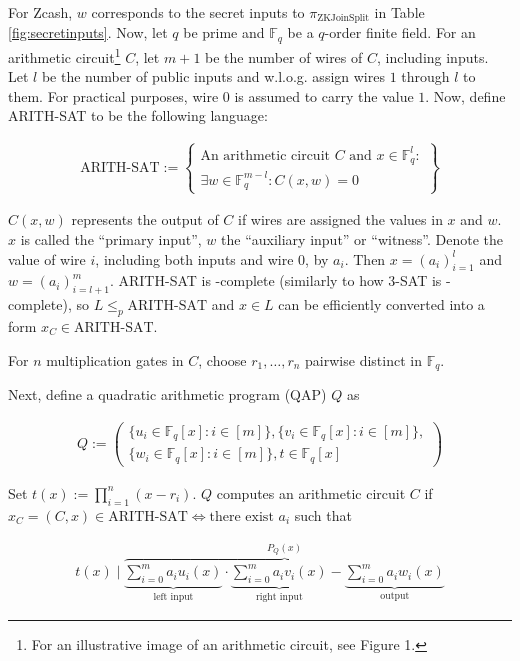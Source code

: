\documentclass{article}
\begin{document}
For Zcash, $w$ corresponds to the secret inputs to $\pi_\text{ZKJoinSplit}$ in Table \ref{fig:secretinputs}.
Now, let $q$ be prime and $\mathbb{F}_q$ be a $q$-order finite field.
For an arithmetic circuit\footnote{For an illustrative image of an arithmetic circuit, see \cite{gennaro:qap} Figure 1.} $C$, let $m + 1$ be the number of wires of $C$, including inputs.
Let $l$ be the number of public inputs and w.l.o.g. assign wires $1$ through $l$ to them.
For practical purposes, wire $0$ is assumed to carry the value $1$.
Now, define ARITH-SAT to be the following language:

\begin{align*}
        \text{ARITH-SAT} := \left\{\begin{aligned}\text{An arithmetic circuit } C \text{ and } x \in \mathbb{F}_q^l \colon \\
        \exists w \in \mathbb{F}_q^{m-l}\colon C(x,w) = 0\end{aligned}\right\}
\end{align*}

$C(x,w)$ represents the output of $C$ if wires are assigned the values in $x$ and $w$.
$x$ is called the ``primary input'', $w$ the ``auxiliary input'' or ``witness''.
Denote the value of wire $i$, including both inputs and wire $0$, by $a_i$.
Then $x = (a_i)_{i=1}^l$ and $w = (a_i)_{i=l+1}^m$.
ARITH-SAT is \NP-complete (similarly to how 3-SAT is \NP-complete), so $L \leq_p \text{ARITH-SAT}$ and $x \in L$ can be efficiently converted into a form $x_C \in \text{ARITH-SAT}$.

For $n$ multiplication gates in $C$, choose $r_1, \ldots, r_n$ pairwise distinct in $\mathbb{F}_q$.

Next, define a quadratic arithmetic program (QAP) $Q$ as

\begin{align*}
        Q := \left(\begin{aligned}\{u_i \in \mathbb{F}_q[x] \colon i \in [m]\},\{v_i \in \mathbb{F}_q[x] \colon i \in [m]\},\\
        \{w_i \in \mathbb{F}_q[x] \colon i \in [m]\}, t \in \mathbb{F}_q[x]\end{aligned}\right)
\end{align*}

Set $t(x) := \prod_{i=1}^n(x-r_i)$.
$Q$ computes an arithmetic circuit $C$ if $x_C = (C,x) \in \text{ARITH-SAT} \iff \text{there exist } a_i$ such that

\begin{align*}
        t(x) \mid \overbrace{\underbrace{\sum_{i=0}^m a_iu_i(x)}_\text{left input} \cdot \underbrace{\sum_{i=0}^m a_iv_i(x)}_\text{right input} - \underbrace{\sum_{i=0}^{m} a_iw_i(x)}_\text{output}}^\text{$P_Q(x)$}
\end{align*}
\end{document}
